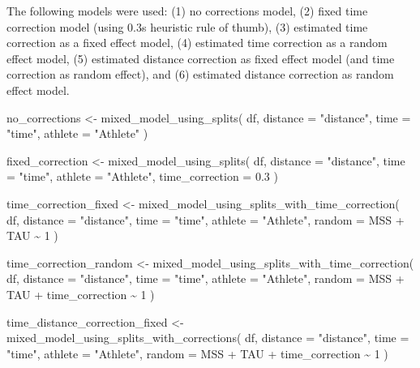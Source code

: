 \documentclass[fleqn,10pt,lineno]{wlpeerj} %
\newenvironment{Shaded}{\begin{snugshade}}{\end{snugshade}}
\newcommand{\AttributeTok}[1]{\textcolor[rgb]{0.77,0.63,0.00}{#1}}
\newcommand{\DecValTok}[1]{\textcolor[rgb]{0.00,0.00,0.81}{#1}}
\newcommand{\FloatTok}[1]{\textcolor[rgb]{0.00,0.00,0.81}{#1}}
\newcommand{\FunctionTok}[1]{\textcolor[rgb]{0.00,0.00,0.00}{#1}}
\newcommand{\NormalTok}[1]{#1}
\newcommand{\OtherTok}[1]{\textcolor[rgb]{0.56,0.35,0.01}{#1}}
\newcommand{\SpecialCharTok}[1]{\textcolor[rgb]{0.00,0.00,0.00}{#1}}
\newcommand{\StringTok}[1]{\textcolor[rgb]{0.31,0.60,0.02}{#1}}
\begin{document}
The following models were used: (1) no corrections model, (2) fixed time correction model (using 0.3s heuristic rule of thumb), (3) estimated time correction as a fixed effect model, (4) estimated time correction as a random effect model, (5) estimated distance correction as fixed effect model (and time correction as random effect), and (6) estimated distance correction as random effect model.

\begin{Shaded}
\begin{Highlighting}[]
\NormalTok{no\_corrections }\OtherTok{\textless{}{-}} \FunctionTok{mixed\_model\_using\_splits}\NormalTok{(}
\NormalTok{  df,}
  \AttributeTok{distance =} \StringTok{"distance"}\NormalTok{,}
  \AttributeTok{time =} \StringTok{"time"}\NormalTok{,}
  \AttributeTok{athlete =} \StringTok{"Athlete"}
\NormalTok{)}

\NormalTok{fixed\_correction }\OtherTok{\textless{}{-}} \FunctionTok{mixed\_model\_using\_splits}\NormalTok{(}
\NormalTok{  df,}
  \AttributeTok{distance =} \StringTok{"distance"}\NormalTok{,}
  \AttributeTok{time =} \StringTok{"time"}\NormalTok{,}
  \AttributeTok{athlete =} \StringTok{"Athlete"}\NormalTok{,}
  \AttributeTok{time\_correction =} \FloatTok{0.3}
\NormalTok{)}

\NormalTok{time\_correction\_fixed }\OtherTok{\textless{}{-}} 
  \FunctionTok{mixed\_model\_using\_splits\_with\_time\_correction}\NormalTok{(}
\NormalTok{    df,}
    \AttributeTok{distance =} \StringTok{"distance"}\NormalTok{,}
    \AttributeTok{time =} \StringTok{"time"}\NormalTok{,}
    \AttributeTok{athlete =} \StringTok{"Athlete"}\NormalTok{,}
    \AttributeTok{random =}\NormalTok{ MSS }\SpecialCharTok{+}\NormalTok{ TAU }\SpecialCharTok{\textasciitilde{}} \DecValTok{1}
\NormalTok{  )}

\NormalTok{time\_correction\_random }\OtherTok{\textless{}{-}} 
  \FunctionTok{mixed\_model\_using\_splits\_with\_time\_correction}\NormalTok{(}
\NormalTok{    df,}
    \AttributeTok{distance =} \StringTok{"distance"}\NormalTok{,}
    \AttributeTok{time =} \StringTok{"time"}\NormalTok{,}
    \AttributeTok{athlete =} \StringTok{"Athlete"}\NormalTok{,}
    \AttributeTok{random =}\NormalTok{ MSS }\SpecialCharTok{+}\NormalTok{ TAU }\SpecialCharTok{+}\NormalTok{ time\_correction }\SpecialCharTok{\textasciitilde{}} \DecValTok{1}
\NormalTok{  )}

\NormalTok{time\_distance\_correction\_fixed }\OtherTok{\textless{}{-}} 
  \FunctionTok{mixed\_model\_using\_splits\_with\_corrections}\NormalTok{(}
\NormalTok{    df,}
    \AttributeTok{distance =} \StringTok{"distance"}\NormalTok{,}
    \AttributeTok{time =} \StringTok{"time"}\NormalTok{,}
    \AttributeTok{athlete =} \StringTok{"Athlete"}\NormalTok{,}
    \AttributeTok{random =}\NormalTok{ MSS }\SpecialCharTok{+}\NormalTok{ TAU }\SpecialCharTok{+}\NormalTok{ time\_correction }\SpecialCharTok{\textasciitilde{}} \DecValTok{1}
\NormalTok{  )}


\end{Highlighting}
\end{Shaded}
\end{document}
